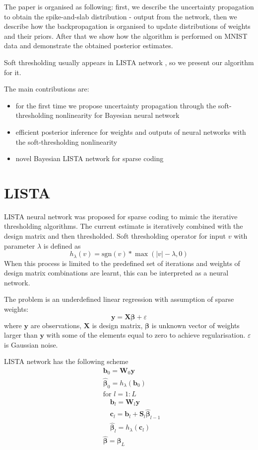 \documentclass[letterpaper]{article}
\begin{document}
The paper is organised as following: first, we describe the uncertainty propagation to obtain the spike-and-slab distribution - output from the network, then we describe how the backpropagation is organised to update distributions of weights and their priors. After that we show how the algorithm is performed on MNIST data and demonstrate the obtained posterior estimates.

Soft thresholding usually appears in LISTA network \cite{gregor2010learning}, so we present our algorithm for it.

The main contributions are: 
\begin{itemize}
\item for the first time we propose uncertainty propagation through the soft-thresholding nonlinearity for Bayesian neural network
\item efficient posterior inference for weights and outputs of neural networks with the soft-thresholding nonlinearity
\item novel Bayesian LISTA network for sparse coding
\end{itemize}

\section{LISTA}

LISTA neural network was proposed for sparse coding to mimic the iterative thresholding algorithms. The current estimate is iteratively combined with the design matrix and then thresholded. Soft thresholding operator for input $v$ with parameter $\lambda$ is defined as
\begin{equation}
h_\lambda(v) = \text{sgn}(v) * \max(|v| - \lambda, 0)
\end{equation} 
When this process is limited to the predefined set of iterations and weights of design matrix combinations are learnt, this can be interpreted as a neural network.

The problem is an underdefined linear regression with assumption of sparse weights:
\begin{equation}
\mathbf{y} = \mathbf{X}\boldsymbol\beta + \varepsilon
\end{equation}
where $\mathbf{y}$ are observations, $\mathbf{X}$ is design matrix, $\boldsymbol\beta$ is unknown vector of weights larger than $\mathbf{y}$ with some of the elements equal to zero to achieve regularisation. $\varepsilon$ is Gaussian noise.

LISTA network has the following scheme
\begin{align}
&\mathbf{b}_0 = \mathbf{W}_0\mathbf{y}\\
&\widehat{\boldsymbol\beta}_0 = h_\lambda(\mathbf{b}_0) \\
&\text{for } l=1:L\\
	&\quad \mathbf{b}_l = \mathbf{W}_l \mathbf{y} \\
	&\quad \mathbf{c}_l = \mathbf{b}_l + \mathbf{S}_l\widehat{\boldsymbol\beta}_{l-1} \\
	&\quad \widehat{\boldsymbol\beta}_{l} = h_\lambda(\mathbf{c}_l) \\
& \widehat{\boldsymbol\beta} = \widehat{\boldsymbol\beta}_{L}
\end{align}
\end{document}
